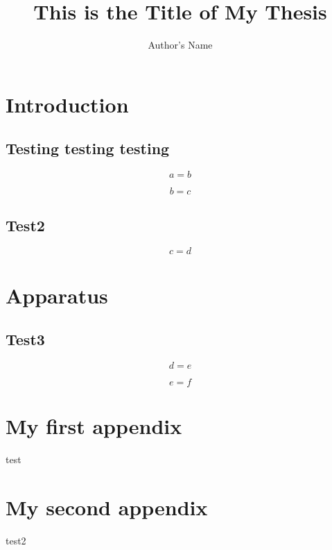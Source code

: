 \documentclass[english,linenumber]{thesis}
\title{This is the Title of My Thesis}
\author{Author's Name}
\begin{document}
\maketitle

\frontmatter


\chapter{Introduction}


\section{Testing testing testing}

\begin{equation}
a=b\label{eq:}\end{equation}


\begin{equation}
b=c\label{eq:}\end{equation}



\section{Test2}


\begin{equation}
c=d\label{eq:}\end{equation}



\chapter{Apparatus}


\section{Test3}

\begin{equation}
d=e\label{eq:}\end{equation}


\begin{equation}
e=f\label{eq:}\end{equation}


\clearpage



\uofsappendix

\begin{appendices}
\chapter{My first appendix}
test

\chapter{My second appendix}
test2
\end{appendices}
 
\end{document}
